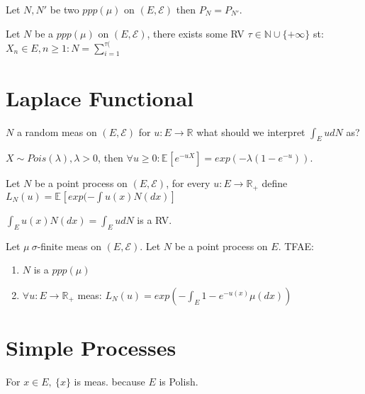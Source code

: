 \begin{prop}[]
	Let $N, N'$ be two $ppp(\mu )$ on $(E, \mathcal{E})$ then $P_N = P_{N'}$.
\end{prop}

\begin{theorem}
	Let $N$ be a $ppp(\mu )$ on $(E, \mathcal{E})$, there exists some RV $\tau \in \mathbb{N} \cup \{+\infty \}$ st: $X_n \in E, n\geq 1: N = \sum_{i=1}^{\tau(} $
\end{theorem}

\section{Laplace Functional}
$N$ a random meas on $(E, \mathcal{E})$ for $u:E \to \mathbb{R}$ what should we interpret $\int_E u dN$ as?

\begin{lemma}[]
	$X \sim Pois(\lambda ), \lambda > 0$, then $\forall u\geq 0: \mathbb{E}_{} \left[ e^{-u X} \right] = exp( - \lambda (1 - e^{-u}))$.
\end{lemma}

\begin{defn}
	Let $N$ be a point process on $(E, \mathcal{E})$, for every $u:E\to \mathbb{R}_+$ define $L_N(u) = \mathbb{E}_{} \left[ exp(- \int u(x) N(dx) \right] $
\end{defn}

\begin{rmk}[]
	$\int_E u(x) N(dx) = \int_E u dN$ is a RV.
\end{rmk}

\begin{theorem}
	Let $\mu \ \sigma$-finite meas on $(E, \mathcal{E})$. Let $N$ be a point process on $E$. TFAE:
\begin{enumerate}
	\item $N$ is a $ppp(\mu)$ 
	\item $\forall u:E \to \mathbb{R}_+$ meas: $L_N(u) = exp(- \int_E 1- e^{-u(x)} \mu (dx))$
\end{enumerate}

\end{theorem}

\section{Simple Processes}
\begin{rmk}[]
	For $x \in E,\ \{x\}$ is meas. because $E$ is Polish.
\end{rmk}

